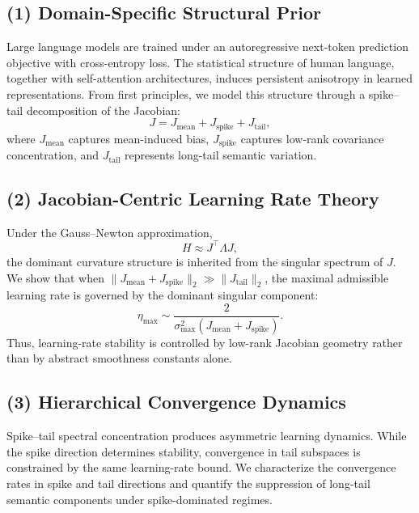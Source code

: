 \documentclass{article}
\begin{document}
\subsection*{(1) Domain-Specific Structural Prior}

Large language models are trained under an autoregressive next-token
prediction objective with cross-entropy loss. The statistical structure
of human language, together with self-attention architectures, induces
persistent anisotropy in learned representations. From first principles,
we model this structure through a spike--tail decomposition of the
Jacobian:
\begin{equation}
J = J_{\text{mean}} + J_{\text{spike}} + J_{\text{tail}},
\end{equation}
where $J_{\text{mean}}$ captures mean-induced bias, $J_{\text{spike}}$
captures low-rank covariance concentration, and $J_{\text{tail}}$
represents long-tail semantic variation.

\subsection*{(2) Jacobian-Centric Learning Rate Theory}

Under the Gauss--Newton approximation,
\begin{equation}
H \approx J^\top \Lambda J,
\end{equation}
the dominant curvature structure is inherited from the singular spectrum
of $J$. We show that when $\|J_{\text{mean}} + J_{\text{spike}}\|_2
\gg \|J_{\text{tail}}\|_2$, the maximal admissible learning rate is governed
by the dominant singular component:
\begin{equation}
\eta_{\max} \sim \frac{2}{\sigma_{\max}^2(J_{\text{mean}} + J_{\text{spike}})}.
\end{equation}
Thus, learning-rate stability is controlled by low-rank Jacobian geometry
rather than by abstract smoothness constants alone.

\subsection*{(3) Hierarchical Convergence Dynamics}

Spike--tail spectral concentration produces asymmetric learning dynamics.
While the spike direction determines stability,
convergence in tail subspaces is constrained by the same learning-rate bound.
We characterize the convergence rates in spike and tail directions and
quantify the suppression of long-tail semantic components under spike-dominated
regimes.
\end{document}
